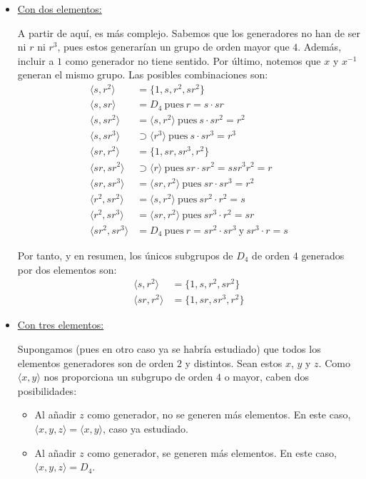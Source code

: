 \begin{ejercicio}
\begin{enumerate}
\begin{itemize}
            \item \ul{Con dos elementos:}
            
            A partir de aquí, es más complejo. Sabemos que los generadores no han de ser ni $r$ ni $r^3$, pues estos generarían un grupo de orden mayor que $4$. Además, incluir a $1$ como generador no tiene sentido. Por último, notemos que $x$ y $x^{-1}$ generan el mismo grupo. Las posibles combinaciones son:
            \begin{align*}
                \langle s, r^2\rangle &= \{1,s,r^2,sr^2\}\\
                \langle s, sr\rangle &= D_4\ \text{pues}\ r=s\cdot sr\\
                \langle s, sr^2\rangle &= \langle s, r^2\rangle\ \text{pues}\ s\cdot sr^2=r^2\\
                \langle s, sr^3\rangle &\supset \langle r^3\rangle\ \text{pues}\ s\cdot sr^3=r^3\\
                \langle sr, r^2\rangle &= \{1,sr,sr^3,r^2\}\\
                \langle sr, sr^2\rangle &\supset \langle r\rangle\ \text{pues}\ sr\cdot sr^2=ssr^3r^2=r\\
                \langle sr, sr^3\rangle &= \langle sr,r^2\rangle\ \text{pues}\ sr\cdot sr^3=r^2\\
                \langle r^2, sr^2\rangle &= \langle s, r^2\rangle\ \text{pues}\ sr^2\cdot r^2=s\\
                \langle r^2, sr^3\rangle &= \langle sr, r^2\rangle\ \text{pues}\ sr^3\cdot r^2=sr\\
                \langle sr^2, sr^3\rangle &= D_4\ \text{pues}\ r=sr^2\cdot sr^3\ \text{y}\ sr^3\cdot r=s
            \end{align*}

            Por tanto, y en resumen, los únicos subgrupos de $D_4$ de orden $4$ generados por dos elementos son:
            \begin{align*}
                \langle s, r^2\rangle &= \{1,s,r^2,sr^2\}\\
                \langle sr, r^2\rangle &= \{1,sr,sr^3,r^2\}
            \end{align*}

            \item \ul{Con tres elementos:}
            
            Supongamos (pues en otro caso ya se habría estudiado) que todos los elementos generadores son de orden $2$ y distintos. Sean estos $x$, $y$ y $z$. Como $\langle x,y\rangle$ nos proporciona un subgrupo de orden $4$ o mayor, caben dos posibilidades:
            \begin{itemize}
                \item Al añadir $z$ como generador, no se generen más elementos. En este caso, $\langle x,y,z\rangle=\langle x,y\rangle$, caso ya estudiado.
                \item Al añadir $z$ como generador, se generen más elementos. En este caso, $\langle x,y,z\rangle=D_4$.
            \end{itemize}


\end{itemize}
\end{enumerate}
\end{ejercicio}
